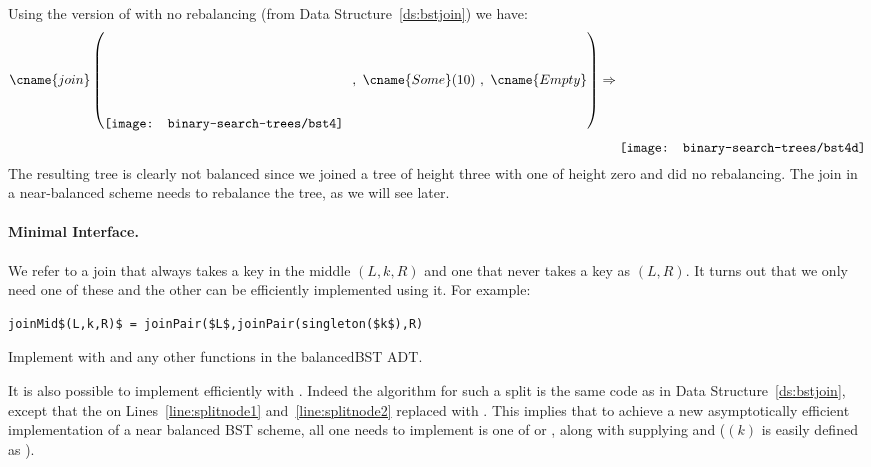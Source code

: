 \begin{example}
Using the version of  with no rebalancing (from Data Structure~\ref{ds:bstjoin})
we have:
\[\cname{join}\left(
\raisebox{-.45in}{\texttt{[image: binary-search-trees/bst4]}}~~,
~\cname{Some}(10)~,
~\cname{Empty}
\right) \Rightarrow 
\raisebox{-.7in}{\texttt{[image: binary-search-trees/bst4d]}}
\]
The resulting tree is clearly not balanced since we joined a tree of
height three with one of height zero and did no rebalancing.  The join
in a near-balanced scheme needs to rebalance the tree, as we will see
later.
\end{example}

\paragraph{Minimal Interface.}
We refer to a join that always takes a key in the middle
$(L,k,R)$ and one that never takes a key as
$(L,R)$.  It turns out that we only need one of these
and the other can be efficiently implemented using it.  For
example:
\begin{lstlisting}[numbers=none]
joinMid$(L,k,R)$ = joinPair($L$,joinPair(singleton($k$),R)
\end{lstlisting}
\begin{exercise}
Implement  with  and any other
functions in the balancedBST ADT.
\end{exercise}
It is also possible to implement  efficiently with
.  Indeed the algorithm for such a split is the same code
as in Data Structure~\ref{ds:bstjoin}, except that the
 on Lines~\ref{line:splitnode1} and~\ref{line:splitnode2}
replaced with .
This implies that to achieve a new asymptotically efficient
implementation of a near balanced BST scheme, all one needs to
implement is one of  or , along with
supplying  and  ($(k)$ is
easily defined as ).  

\begin{comment}
\begin{exercise}
Write a version of \cname{insert} that takes a function $f : \data
\times \data$ and if the insertion key $k$ is already in the tree
applies $f$ to the old and new value to return the value to associate
with the key.
\end{exercise}
\end{comment}

